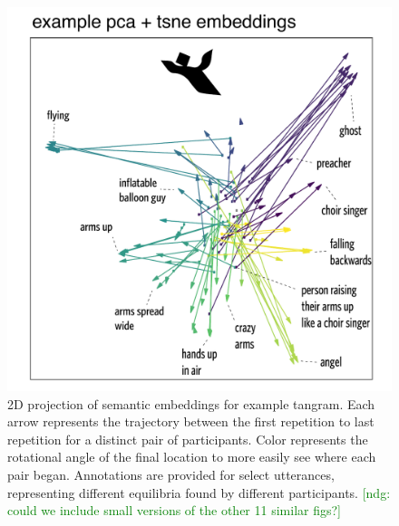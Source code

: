 \documentclass[alpha-refs]{wiley-article}
\newcommand{\ndg}[1]{\textcolor{green}{[ndg: #1]}}
\begin{document}
\begin{figure}[t!]
\centering
\includegraphics[scale=.6]{tsne-tangramC_annotated.pdf}
\caption{2D projection of semantic embeddings for example tangram. Each arrow represents the trajectory between the first repetition to last repetition for a distinct pair of participants. Color represents the rotational angle of the final location to more easily see where each pair began. Annotations are provided for select utterances, representing different equilibria found by different participants. \ndg{could we include small versions of the other 11 similar figs?}}
\label{fig:tsne}
\end{figure}
\end{document}
